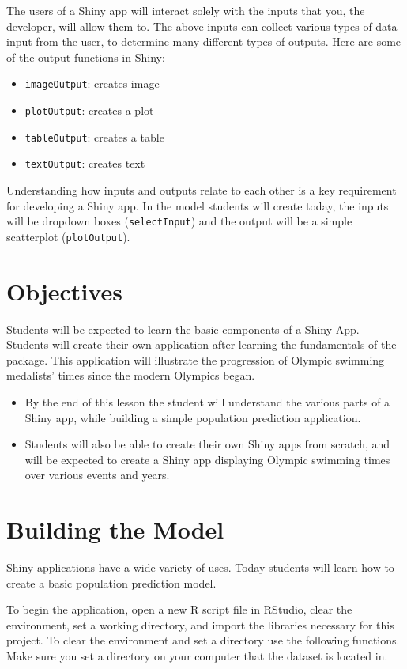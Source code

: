 \noindent The users of a Shiny app will interact solely with the inputs that you, the developer, will allow them to.
The above inputs can collect various types of data input from the user, to determine many different types of outputs.
Here are some of the output functions in Shiny:
\begin{itemize}
    \item \texttt{imageOutput}: creates image
    \item \texttt{plotOutput}: creates a plot
    \item \texttt{tableOutput}: creates a table
    \item \texttt{textOutput}: creates text
\end{itemize}

Understanding how inputs and outputs relate to each other is a key requirement for developing a Shiny app.
In the model students will create today, the inputs will be dropdown boxes (\texttt{selectInput}) and the output will be a simple scatterplot (\texttt{plotOutput}). 

\section{Objectives}
Students will be expected to learn the basic components of a Shiny App.
Students will create their own application after learning the fundamentals of the package.
This application will illustrate the progression of Olympic swimming medalists' times since the modern Olympics began. 
\begin{itemize}
\item By the end of this lesson the student will understand the various parts of a Shiny app, while building a simple population prediction application.
\item Students will also be able to create their own Shiny apps from scratch, and will be expected to create a Shiny app displaying Olympic swimming times over various events and years.
\end{itemize}
\section{Building the Model}

Shiny applications have a wide variety of uses. Today students will learn how to create a basic population prediction model. 

\noindent To begin the application, open a new R script file in RStudio, clear the environment, set a working directory, and import the libraries necessary for this project.
To clear the environment and set a directory use the following functions.
Make sure you set a directory on your computer that the dataset is located in. 

